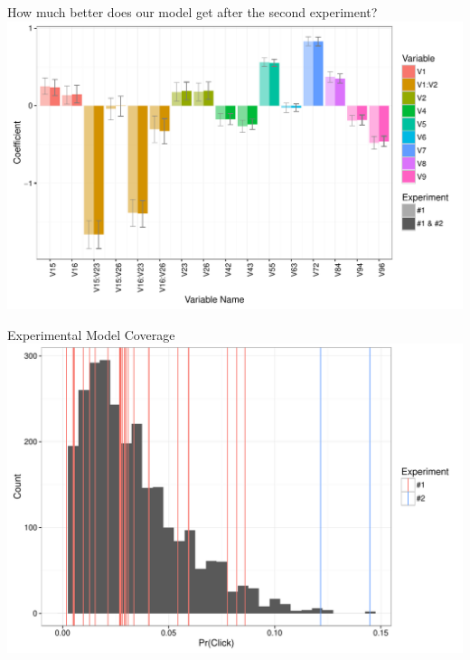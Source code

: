 \documentclass[11pt,xcolor=svgnames]{beamer}
\begin{document}
\begin{frame}
How much better does our model get after the second experiment?
\includegraphics[width=\textwidth]{final_model_coefs_crazy.pdf}
\end{frame}

\begin{frame}
Experimental Model Coverage
\includegraphics[width=\textwidth]{hist.pdf}
\end{frame}
\end{document}
